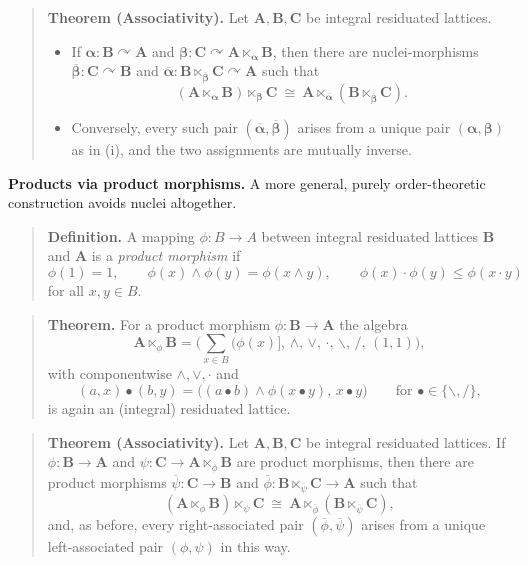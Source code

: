 \documentclass[a4paper]{article} %
\newcommand{\al}[1]{\mathbf{#1}}
\newcommand{\nmorph}{\curvearrowright}
\begin{document}
\begin{quote}
\textbf{Theorem (Associativity).}
Let $\al A,\al B,\al C$ be integral residuated lattices.
\begin{itemize}
\item[(i)] If $\bm\alpha\colon\al B\nmorph\al A$ and
$\bm\beta\colon\al C\nmorph\al A\ltimes_{\bm\alpha}\al B$, then there are
nuclei-morphisms $\overline{\bm\beta}\colon\al C\nmorph\al B$ and
$\overline{\bm\alpha}\colon\al B\ltimes_{\overline{\bm\beta}}\al C
\nmorph\al A$ such that
$$(\al A\ltimes_{\bm\alpha}\al B)\ltimes_{\bm\beta}\al C\ \cong\
\al A\ltimes_{\overline{\bm\alpha}}(\al B\ltimes_{\overline{\bm\beta}}\al C).$$
\item[(ii)] Conversely, every such pair
$(\overline{\bm\alpha},\overline{\bm\beta})$ arises from a unique pair
$(\bm\alpha,\bm\beta)$ as in (i), and the two assignments are mutually
inverse.
\end{itemize}
\end{quote}

\medskip
\noindent\textbf{Products via product morphisms.}
A more general, purely order-theoretic construction avoids nuclei
altogether.

\begin{quote}
\textbf{Definition.}
A mapping $\phi\colon B\to A$ between integral residuated lattices $\al B$
and $\al A$ is a \emph{product morphism} if
$$\phi(1)=1,\qquad \phi(x)\wedge\phi(y)=\phi(x\wedge y),\qquad
\phi(x)\cdot\phi(y)\leq\phi(x\cdot y)$$
for all $x,y\in B$.
\end{quote}

\begin{quote}
\textbf{Theorem.}
For a product morphism $\phi\colon\al B\to\al A$ the algebra
$$\al A\ltimes_\phi\al B=\Big(\textstyle\sum_{x\in B}(\phi(x)],\,\wedge,\,
\vee,\,\cdot,\,\backslash,\,/,\,(1,1)\Big),$$
with componentwise $\wedge,\vee,\cdot$ and
$$(a,x)\bullet(b,y)=\big((a\bullet b)\wedge\phi(x\bullet y),\,x\bullet y\big)
\qquad\text{for }\bullet\in\{\backslash,/\},$$
is again an (integral) residuated lattice.
\end{quote}

\begin{quote}
\textbf{Theorem (Associativity).}
Let $\al A,\al B,\al C$ be integral residuated lattices. If
$\phi\colon\al B\to\al A$ and $\psi\colon\al C\to\al A\ltimes_\phi\al B$
are product morphisms, then there are product morphisms
$\overline\psi\colon\al C\to\al B$ and
$\overline\phi\colon\al B\ltimes_{\overline\psi}\al C\to\al A$ such that
$$(\al A\ltimes_\phi\al B)\ltimes_\psi\al C\ \cong\
\al A\ltimes_{\overline\phi}(\al B\ltimes_{\overline\psi}\al C),$$
and, as before, every right-associated pair
$(\overline\phi,\overline\psi)$ arises from a unique left-associated pair
$(\phi,\psi)$ in this way.
\end{quote}
\end{document}
